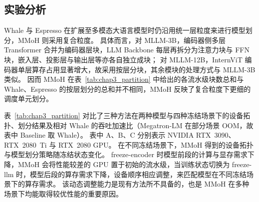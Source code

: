 \subsection{实验分析}

Whale 与 Espresso 在扩展至多模态大语言模型时仍沿用统一层粒度来进行模型划分，MMoH 则采用复合粒度。
具体而言，对 MLLM-3B，编码器侧多层 Transformer 合并为编码器层块，LLM Backbone 每层再拆分为注意力块与 FFN 块，嵌入层、投影层与输出层等亦各自独立成块；
对 MLLM-12B，InternViT 编码器单层算存占用显著增大，故采用按层分块，其余模块的处理方式与 MLLM-3B 类似。
因而 MMoH 在表~\ref{tab:chap3_partition} 中给出的各流水级块数总和与 Whale、Espresso 的按层划分的总和并不相同，MMoH 反映了复合粒度下更细的调度单元划分。

表~\ref{tab:chap3_partition} 对比了三种方法在两种模型与四种冻结场景下的设备拓扑、划分结果及相对 Whale 的吞吐加速比（Megatron-LM 在部分场景 OOM，故表中 Baseline 取 Whale）。
表中 A、B、C 分别表示 NVIDIA RTX~3090、RTX~2080~Ti 与 RTX~2080 GPU。
在不同冻结场景下，MMoH 得到的设备拓扑与模型划分策略随冻结状态变化。
freeze-encoder 时模型前段的计算与显存需求下降，MMoH 会将性能较差的 GPU 置于初始的流水级，当训练状态切换为 freeze-llm 时，模型后段的算存需求下降，设备顺序相应调整，来匹配模型在不同冻结场景下的算存需求。
该动态调整能力是现有方法所不具备的，也是 MMoH 在多种场景下均能取得较优性能的重要原因。

